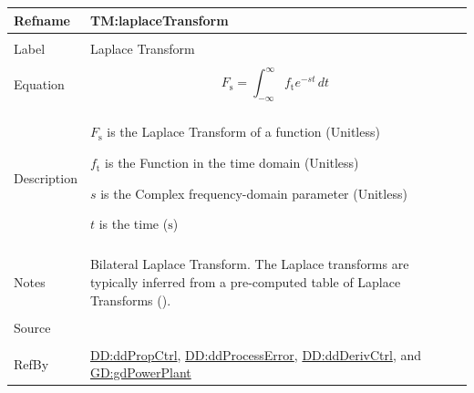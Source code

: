 \documentclass[12pt]{article}
\begin{document}
\vspace{\baselineskip}
\noindent
\begin{minipage}{\textwidth}
\begin{tabular}{>{\raggedright}p{}>{\raggedright\arraybackslash}p{}}
\toprule \textbf{Refname} & \textbf{TM:laplaceTransform}
\label{TM:laplaceTransform}
\\ \midrule \\
Label & Laplace Transform
        
\\ \midrule \\
Equation & \begin{displaymath}
           {F_{\text{s}}}=\int_{-∞}^{∞}{{f_{\text{t}}} e^{-s t}}\,dt
           \end{displaymath}
\\ \midrule \\
Description & \begin{symbDescription}
              \item{${F_{\text{s}}}$ is the Laplace Transform of a function (Unitless)}
              \item{${f_{\text{t}}}$ is the Function in the time domain (Unitless)}
              \item{$s$ is the Complex frequency-domain parameter (Unitless)}
              \item{$t$ is the time (${\text{s}}$)}
              \end{symbDescription}
\\ \midrule \\
Notes & Bilateral Laplace Transform. The Laplace transforms are typically inferred from a pre-computed table of Laplace Transforms (\cite{laplaceWiki}).
        
\\ \midrule \\
Source & \cite{laplaceWiki}
         
\\ \midrule \\
RefBy & \hyperref[DD:ddPropCtrl]{DD:ddPropCtrl}, \hyperref[DD:ddProcessError]{DD:ddProcessError}, \hyperref[DD:ddDerivCtrl]{DD:ddDerivCtrl}, and \hyperref[GD:gdPowerPlant]{GD:gdPowerPlant}
        
\\ \bottomrule
\end{tabular}
\end{minipage}
\vspace{\baselineskip}
\noindent
\end{document}
